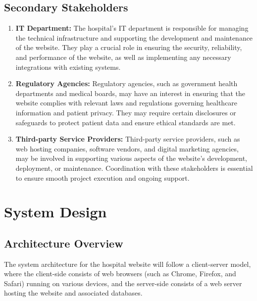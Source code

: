 \documentclass{article}
\begin{document}
\subsection{Secondary Stakeholders}
\begin{enumerate}
    \item \textbf{IT Department:} The hospital's IT department is responsible for managing the technical infrastructure and supporting the development and maintenance of the website. They play a crucial role in ensuring the security, reliability, and performance of the website, as well as implementing any necessary integrations with existing systems.
    
    \item \textbf{Regulatory Agencies:} Regulatory agencies, such as government health departments and medical boards, may have an interest in ensuring that the website complies with relevant laws and regulations governing healthcare information and patient privacy. They may require certain disclosures or safeguards to protect patient data and ensure ethical standards are met.
    
    \item \textbf{Third-party Service Providers:} Third-party service providers, such as web hosting companies, software vendors, and digital marketing agencies, may be involved in supporting various aspects of the website's development, deployment, or maintenance. Coordination with these stakeholders is essential to ensure smooth project execution and ongoing support.
\end{enumerate}


\clearpage

\section{System Design} \label{sec:system_design}

\subsection{Architecture Overview}
The system architecture for the hospital website will follow a client-server model, where the client-side consists of web browsers (such as Chrome, Firefox, and Safari) running on various devices, and the server-side consists of a web server hosting the website and associated databases.
\end{document}
